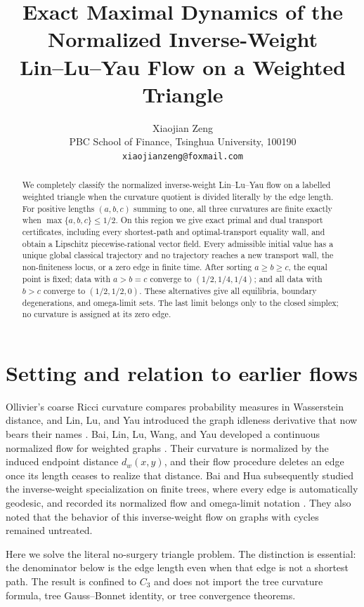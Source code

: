 \documentclass[11pt]{article}
\title{Exact Maximal Dynamics of the Normalized Inverse-Weight\\
Lin--Lu--Yau Flow on a Weighted Triangle}
\author{Xiaojian Zeng\\
\small PBC School of Finance, Tsinghua University, 100190\\
\small \texttt{xiaojianzeng@foxmail.com}}
\date{}
\theoremstyle{remark}
\begin{document}
\maketitle

\begin{abstract}
We completely classify the normalized inverse-weight Lin--Lu--Yau flow on a
labelled weighted triangle when the curvature quotient is divided literally
by the edge length.  For positive lengths $(a,b,c)$ summing to one, all three
curvatures are finite exactly when $\max\{a,b,c\}\leq 1/2$.  On this region
we give exact primal and dual transport certificates, including every
shortest-path and optimal-transport equality wall, and obtain a Lipschitz
piecewise-rational vector field.  Every admissible initial value has a unique
global classical trajectory and no trajectory reaches a new transport wall,
the non-finiteness locus, or a zero edge in finite time.  After sorting
$a\geq b\geq c$, the equal point is fixed; data with $a>b=c$ converge to
$(1/2,1/4,1/4)$; and all data with $b>c$ converge to
$(1/2,1/2,0)$.  These alternatives give all equilibria, boundary
degenerations, and omega-limit sets.  The last limit belongs only to the
closed simplex; no curvature is assigned at its zero edge.
\end{abstract}

\section{Setting and relation to earlier flows}

Ollivier's coarse Ricci curvature compares probability measures in
Wasserstein distance, and Lin, Lu, and Yau introduced the graph idleness
derivative that now bears their names
\cite{Ollivier2009,LinLuYau2011}.  Bai, Lin, Lu, Wang, and Yau developed a
continuous normalized flow for weighted graphs
\cite{BaiLinLuWangYau2024}.  Their curvature is normalized by the induced
endpoint distance $d_w(x,y)$, and their flow procedure deletes an edge once
its length ceases to realize that distance.  Bai and Hua subsequently studied
the inverse-weight specialization on finite trees, where every edge is
automatically geodesic, and recorded its normalized flow and omega-limit
notation \cite{BaiHua2026}.  They also noted that the behavior of this
inverse-weight flow on graphs with cycles remained untreated.

Here we solve the literal no-surgery triangle problem.  The distinction is
essential: the denominator below is the edge length even when that edge is
not a shortest path.  The result is confined to $C_3$ and does not import the
tree curvature formula, tree Gauss--Bonnet identity, or tree convergence
theorems.
\end{document}
